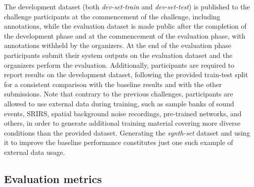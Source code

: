 \documentclass{article}
\begin{document}
\begin{sloppy}
The development dataset (both \emph{dev-set-train} and \emph{dev-set-test}) is published to the challenge participants at the commencement of the challenge, including annotations, while the evaluation dataset is made public after the completion of the development phase and at the commencement of the evaluation phase, with annotations withheld by the organizers. At the end of the evaluation phase participants submit their system outputs on the evaluation dataset and the organizers perform the evaluation.
Additionally, participants are required to report results on the development dataset, following the provided train-test split for a consistent comparison with the baseline results and with the other submissions. Note that contrary to the previous challenges, participants are allowed to use external data during training, such as sample banks of sound events, SRIRS, spatial background noise recordings, pre-trained networks, and others, in order to generate additional training material covering more diverse conditions than the provided dataset. Generating the \emph{synth-set} dataset and using it to improve the baseline performance constitutes just one such example of external data usage. 




\subsection{Evaluation metrics}


\end{sloppy}
\end{document}
